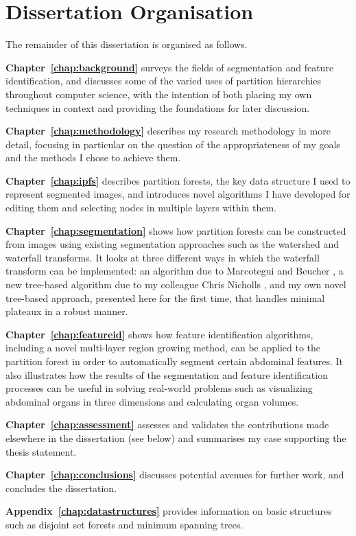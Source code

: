 \fi

\section*{Dissertation Organisation}

The remainder of this dissertation is organised as follows.

\textbf{Chapter~\ref{chap:background}} surveys the fields of segmentation and feature identification, and discusses some of the varied uses of partition hierarchies throughout computer science, with the intention of both placing my own techniques in context and providing the foundations for later discussion.

\textbf{Chapter~\ref{chap:methodology}} describes my research methodology in more detail, focusing in particular on the question of the appropriateness of my goals and the methods I chose to achieve them.

\textbf{Chapter~\ref{chap:ipfs}} describes partition forests, the key data structure I used to represent segmented images, and introduces novel algorithms I have developed for editing them and selecting nodes in multiple layers within them.

\textbf{Chapter~\ref{chap:segmentation}} shows how partition forests can be constructed from images using existing segmentation approaches such as the watershed and waterfall transforms. It looks at three different ways in which the waterfall transform can be implemented: an algorithm due to Marcotegui and Beucher \cite{marcotegui05}, a new tree-based algorithm due to my colleague Chris Nicholls \cite{nicholls09}, and my own novel tree-based approach, presented here for the first time, that handles minimal plateaux in a robust manner.

\textbf{Chapter~\ref{chap:featureid}} shows how feature identification algorithms, including a novel multi-layer region growing method, can be applied to the partition forest in order to automatically segment certain abdominal features. It also illustrates how the results of the segmentation and feature identification processes can be useful in solving real-world problems such as visualizing abdominal organs in three dimensions and calculating organ volumes.

\textbf{Chapter~\ref{chap:assessment}} assesses and validates the contributions made elsewhere in the dissertation (see below) and summarises my case supporting the thesis statement.

\textbf{Chapter~\ref{chap:conclusions}} discusses potential avenues for further work, and concludes the dissertation.

\textbf{Appendix~\ref{chap:datastructures}} provides information on basic structures such as disjoint set forests and minimum spanning trees.